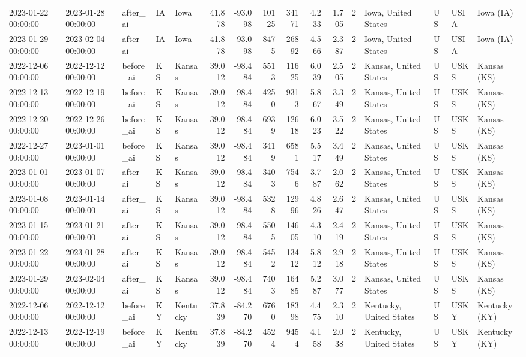 \begin{tabular}{lllllrrrrrrlllll}
2023-01-22 00:00:00 & 2023-01-28 00:00:00 & after\_ai & IA & Iowa & 41.878 & -93.098 & 10125 & 34171 & 4.233 & 1.705 & 2 & Iowa, United States & US & USIA & Iowa (IA) \\
2023-01-29 00:00:00 & 2023-02-04 00:00:00 & after\_ai & IA & Iowa & 41.878 & -93.098 & 8475 & 26892 & 4.566 & 2.387 & 2 & Iowa, United States & US & USIA & Iowa (IA) \\
2022-12-06 00:00:00 & 2022-12-12 00:00:00 & before\_ai & KS & Kansas & 39.012 & -98.484 & 5513 & 11625 & 6.039 & 2.505 & 2 & Kansas, United States & US & USKS & Kansas (KS) \\
2022-12-13 00:00:00 & 2022-12-19 00:00:00 & before\_ai & KS & Kansas & 39.012 & -98.484 & 4250 & 9313 & 5.867 & 3.349 & 2 & Kansas, United States & US & USKS & Kansas (KS) \\
2022-12-20 00:00:00 & 2022-12-26 00:00:00 & before\_ai & KS & Kansas & 39.012 & -98.484 & 6939 & 12618 & 6.023 & 3.522 & 2 & Kansas, United States & US & USKS & Kansas (KS) \\
2022-12-27 00:00:00 & 2023-01-01 00:00:00 & before\_ai & KS & Kansas & 39.012 & -98.484 & 3419 & 6581 & 5.517 & 3.449 & 2 & Kansas, United States & US & USKS & Kansas (KS) \\
2023-01-01 00:00:00 & 2023-01-07 00:00:00 & after\_ai & KS & Kansas & 39.012 & -98.484 & 3403 & 7546 & 3.787 & 2.062 & 2 & Kansas, United States & US & USKS & Kansas (KS) \\
2023-01-08 00:00:00 & 2023-01-14 00:00:00 & after\_ai & KS & Kansas & 39.012 & -98.484 & 5328 & 12996 & 4.826 & 2.647 & 2 & Kansas, United States & US & USKS & Kansas (KS) \\
2023-01-15 00:00:00 & 2023-01-21 00:00:00 & after\_ai & KS & Kansas & 39.012 & -98.484 & 5505 & 14605 & 4.310 & 2.419 & 2 & Kansas, United States & US & USKS & Kansas (KS) \\
2023-01-22 00:00:00 & 2023-01-28 00:00:00 & after\_ai & KS & Kansas & 39.012 & -98.484 & 5452 & 13412 & 5.812 & 2.918 & 2 & Kansas, United States & US & USKS & Kansas (KS) \\
2023-01-29 00:00:00 & 2023-02-04 00:00:00 & after\_ai & KS & Kansas & 39.012 & -98.484 & 7403 & 16485 & 5.287 & 3.077 & 2 & Kansas, United States & US & USKS & Kansas (KS) \\
2022-12-06 00:00:00 & 2022-12-12 00:00:00 & before\_ai & KY & Kentucky & 37.839 & -84.270 & 6760 & 18398 & 4.475 & 2.310 & 2 & Kentucky, United States & US & USKY & Kentucky (KY) \\
2022-12-13 00:00:00 & 2022-12-19 00:00:00 & before\_ai & KY & Kentucky & 37.839 & -84.270 & 4524 & 9454 & 4.158 & 2.038 & 2 & Kentucky, United States & US & USKY & Kentucky (KY) \\

\end{tabular}
